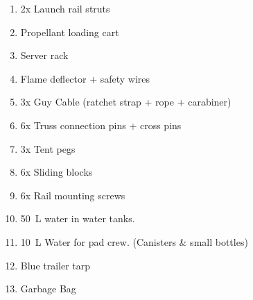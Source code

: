 \begin{enumerate}[label=PP\arabic*.]
\begin{enumerate}[label*=\arabic*.]
            \item 2x Launch rail struts\leftcheckbox
            \item Propellant loading cart\leftcheckbox
            \item Server rack\leftcheckbox
            \item Flame deflector + safety wires
            \item 3x Guy Cable (ratchet strap + rope + carabiner)\leftcheckbox
            \item 6x Truss connection pins + cross pins\leftcheckbox
            \item 3x Tent pegs\leftcheckbox
            \item 6x Sliding blocks\leftcheckbox
            \item 6x Rail mounting screws\leftcheckbox
            \item \SI{50}{\liter} water in water tanks.\leftcheckbox
            \item \SI{10}{\liter} Water for pad crew. (Canisters \& small bottles)\leftcheckbox
            \item Blue trailer tarp\leftcheckbox
            \item Garbage Bag\leftcheckbox
        \end{enumerate} 
    
    

\end{enumerate}
